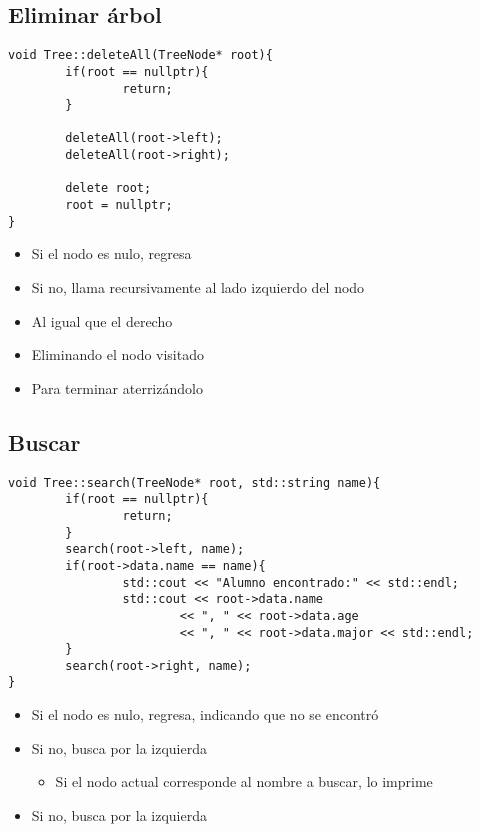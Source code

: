 \documentclass[11pt]{article}
\begin{document}
\subsection{Eliminar árbol}
\label{sec:org3c49737}
\begin{verbatim}
void Tree::deleteAll(TreeNode* root){
        if(root == nullptr){
                return;
        }

        deleteAll(root->left);
        deleteAll(root->right);

        delete root;
        root = nullptr;
}
\end{verbatim}
\begin{itemize}
\item Si el nodo es nulo, regresa
\item Si no, llama recursivamente al lado izquierdo
del nodo
\item Al igual que el derecho
\item Eliminando el nodo visitado
\item Para terminar aterrizándolo
\end{itemize}
\subsection{Buscar}
\label{sec:orgd1af7ef}
\begin{verbatim}
void Tree::search(TreeNode* root, std::string name){
        if(root == nullptr){
                return;
        }
        search(root->left, name);
        if(root->data.name == name){
                std::cout << "Alumno encontrado:" << std::endl;
                std::cout << root->data.name
                        << ", " << root->data.age
                        << ", " << root->data.major << std::endl;
        }
        search(root->right, name);
}
\end{verbatim}
\begin{itemize}
\item Si el nodo es nulo, regresa, indicando que no se encontró
\item Si no, busca por la izquierda
\begin{itemize}
\item Si el nodo actual corresponde al nombre a
buscar, lo imprime
\end{itemize}
\item Si no, busca por la izquierda
\end{itemize}
\end{document}
